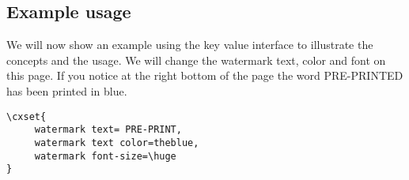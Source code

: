 



%
%
%
%






\subsection{Example usage}

We will now show an example using the key value interface to illustrate the concepts and the usage. We will change the watermark text, color and font on this page. If you notice at the right bottom of the page the word \textsc{PRE-PRINTED} has been printed in blue.

\begin{tcolorbox}
\begin{lstlisting}
\cxset{
     watermark text= PRE-PRINT,
     watermark text color=theblue,
     watermark font-size=\huge
}
\end{lstlisting}
\end{tcolorbox}


